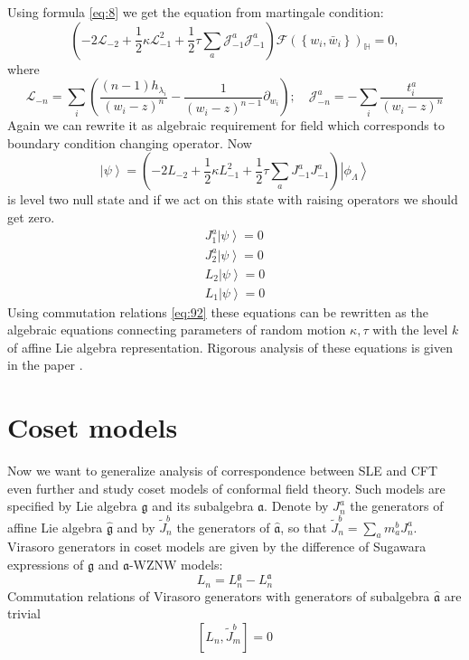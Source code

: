 \documentclass[a4paper]{jpconf}
\theoremstyle{definition}
\newcommand{\gf}{\mathfrak{g}}
\newcommand{\af}{\mathfrak{a}}
\newcommand{\gfh}{\hat{\mathfrak{g}}}
\newcommand{\afh}{\hat{\mathfrak{a}}}
\theoremstyle{definition} \newtheorem{Def}{Definition}
\begin{document}
Using formula \eqref{eq:8} we get the equation from martingale condition:
\begin{equation}
  \left(-2 \mathcal{L}_{-2}+\frac{1}{2}\kappa \mathcal{L}_{-1}^{2}+\frac{1}{2}\tau\sum_{a} \mathcal{J}^{a}_{-1} \mathcal{J}^{a}_{-1}\right)        \mathcal{F}(\left\{w_{i}, \bar w_{i}\right\})_{\mathbb{H}}=0,
  \label{eq:27}
\end{equation}
where
\begin{equation*}
  \mathcal{L}_{-n}=\sum_{i}\left(\frac{(n-1)h_{\lambda_{i}}}{(w_{i}-z)^{n}}-\frac{1}{(w_{i}-z)^{n-1}}\partial_{w_{i}}\right);\quad \mathcal{J}^{a}_{{-n}}=-\sum_{i}\frac{t^{a}_{i}}{(w_{i}-z)^{n}}
\end{equation*}
Again we can rewrite it as algebraic requirement for  field  which corresponds to boundary condition changing operator. Now
\begin{equation}
  \left| \psi\right>=\left(-2 L_{-2}+\frac{1}{2}\kappa L_{-1}^{2}+\frac{1}{2}\tau\sum_{a} J^{a}_{-1} J^{a}_{-1}\right) \left|\phi_{\Lambda}\right>    
  \label{eq:16}
\end{equation}
is level two null state and if we act on this state with raising operators we should get zero.
\begin{eqnarray}
  J^{a}_{1} \left|\psi\right>=0\\
  J^{a}_{2}\left|\psi\right>=0\\
  L_{2}\left|\psi\right>=0\\
  L_{1}\left|\psi\right>=0
\end{eqnarray}
Using commutation relations \eqref{eq:92} these equations can be rewritten as the algebraic equations connecting parameters of random motion $\kappa, \tau$ with the level $k$ of affine Lie algebra representation. Rigorous analysis of these equations is given in the paper \cite{alekseev2010sle}.

\section{Coset models}
\label{sec:coset-models}
Now we want to generalize analysis of correspondence between SLE and CFT even further and study coset models of conformal field theory\cite{Goddard198588}. Such models are specified by  Lie algebra $\gf$ and its subalgebra $\af$. Denote by $J_{n}^{a}$ the generators of affine Lie algebra $\gfh$ and by $\tilde{J}_{n}^{b}$ the generators of $\afh$, so that $\tilde{J}^{b}_{n}=\sum_{a} m_{a}^{b} J^{a}_{n}$.
Virasoro generators in coset models are given by the difference of Sugawara expressions of $\gf$ and $\af$-WZNW models:
\begin{equation*}
  L_{n}=L_{n}^{\gf}-L_{n}^{\af}
\end{equation*}
Commutation relations of Virasoro generators with generators of subalgebra $\afh$ are trivial
\begin{equation}
  \label{eq:26}
  \left[L_{n},\tilde{J}^{b}_{m}\right]=0
\end{equation}
\end{document}
